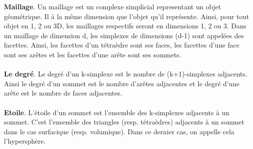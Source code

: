 \documentclass[a4paper,11pt,openany]{article}
\begin{document}
\textbf{Maillage}. Un maillage est un complexe simplicial representant un objet géométrique. Il à la même dimension que l'objet qu'il représente. Ainsi, pour tout objet en 1, 2 ou 3D, les maillages respectifs seront en dimensions 1, 2 ou 3. Dans un maillage de dimension d, les simplexes de dimensions (d-1) sont appelées des facettes. Ainsi, les facettes d'un tétraèdre sont ses faces, les facettes d'une face sont ses arêtes et les facettes d'une arête sont ses sommets.\\\\
\textbf{Le degré}. Le degré d'un k-simplexe est le nombre de (k+1)-simplexes adjacents. Ainsi le degré d'un sommet est le nombre d'arêtes adjacentes et le degré d'une arête est le nombre de faces adjacentes.\\\\
\textbf{Etoile}. L'étoile d'un sommet est l'ensemble des k-simplexes adjacents à un sommet. C'est l'ensemble des triangles (resp. tétraèdres) adjacents à un sommet dans le cas surfacique (resp. volumique). Dans ce dernier cas, on appelle cela l'hypersphère.\\\\

\end{document}
